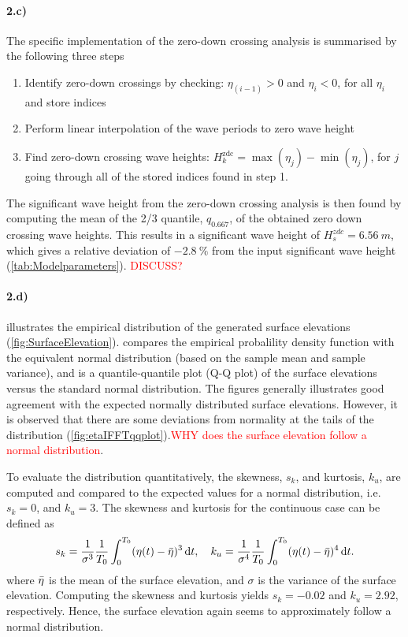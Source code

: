 \paragraph{2.c)} The specific implementation of the zero-down crossing analysis is summarised by the following three steps
\begin{enumerate}
    \item Identify zero-down crossings by checking: $\eta_{(i-1)}> 0$ and $\eta_{i} < 0$, for all $\eta_i$ and store indices
    \item Perform linear interpolation of the wave periods to zero wave height
    \item Find zero-down crossing wave heights: $H_k^{\text{zdc}}=\max(\eta_{j})-\min(\eta_{j})$, for $j$ going through all of the stored indices found in step 1.
\end{enumerate}
The significant wave height from the zero-down crossing analysis is then found by computing the mean of the 2/3 quantile, $q_{0.667}$, of the obtained zero down crossing wave heights. This results in a significant wave height of $H_s^{zdc}=\SI{6.56}{m}$, which gives a relative deviation of $\SI{-2.8}{\percent}$ from the input significant wave height (\cref{tab:Modelparameters}). \textcolor{red}{DISCUSS?}

\paragraph{2.d)}  illustrates the empirical distribution of the generated surface elevations (\cref{fig:SurfaceElevation}).  compares the empirical probalility density function with the equivalent normal distribution (based on the sample mean and sample variance), and  is a quantile-quantile plot (Q-Q plot) of the surface elevations versus the standard normal distribution. The figures generally illustrates good agreement with the expected normally distributed surface elevations. However, it is observed that there are some deviations from normality at the tails of the distribution (\cref{fig:etaIFFTqqplot}).\textcolor{red}{WHY does the surface elevation follow a normal distribution}. 

To evaluate the distribution quantitatively, the skewness, $s_k$, and kurtosis, $k_u$, are computed and compared to the expected values for a normal distribution, i.e. $s_k=0$, and $k_u=3$. The skewness and kurtosis for the continuous case can be defined as
\begin{equation}
    s_k = \frac{1}{\sigma^3}\frac{1}{T_0}\int_0^{T_0} (\eta(t)-\Bar{\eta})^3 \dif t, \quad k_u = \frac{1}{\sigma^4}\frac{1}{T_0}\int_0^{T_0} (\eta(t)-\Bar{\eta})^4 \dif t.
\end{equation}
where $\Bar{\eta}$ is the mean of the surface elevation, and $\sigma$ is the variance of the surface elevation. Computing the skewness and kurtosis yields $s_k=-0.02$ and $k_u=2.92$, respectively. Hence, the surface elevation again seems to approximately follow a normal distribution.

